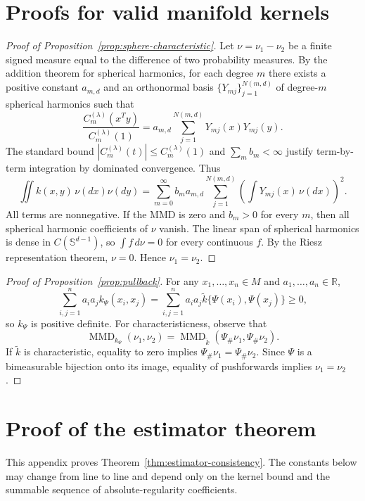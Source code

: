 \documentclass[11pt]{article}
\newcommand{\R}{\mathbb{R}}
\newcommand{\1}{\mathbf{1}}
\newcommand{\MMD}{\operatorname{MMD}}
\newcommand{\Sphere}{\mathbb{S}}
\begin{document}
\section{Proofs for valid manifold kernels}
\label{app:kernels}

\begin{proof}[Proof of Proposition~\ref{prop:sphere-characteristic}]
Let $\nu=\nu_1-\nu_2$ be a finite signed measure equal to the difference of two probability measures. By the addition theorem for spherical harmonics, for each degree $m$ there exists a positive constant $a_{m,d}$ and an orthonormal basis $\{Y_{mj}\}_{j=1}^{N(m,d)}$ of degree-$m$ spherical harmonics such that
\[
\frac{C_m^{(\lambda)}(x^Ty)}{C_m^{(\lambda)}(1)}
=a_{m,d}\sum_{j=1}^{N(m,d)}Y_{mj}(x)Y_{mj}(y).
\]
The standard bound $|C_m^{(\lambda)}(t)|\le C_m^{(\lambda)}(1)$ and $\sum_m b_m<\infty$ justify term-by-term integration by dominated convergence. Thus
\[
\iint k(x,y)\,\nu(dx)\nu(dy)
=\sum_{m=0}^\infty b_m a_{m,d}\sum_{j=1}^{N(m,d)}\left(\int Y_{mj}(x)\,\nu(dx)\right)^2.
\]
All terms are nonnegative. If the MMD is zero and $b_m>0$ for every $m$, then all spherical harmonic coefficients of $\nu$ vanish. The linear span of spherical harmonics is dense in $C(\Sphere^{d-1})$, so $\int f\,d\nu=0$ for every continuous $f$. By the Riesz representation theorem, $\nu=0$. Hence $\nu_1=\nu_2$.
\end{proof}

\begin{proof}[Proof of Proposition~\ref{prop:pullback}]
For any $x_1,\ldots,x_n\in M$ and $a_1,\ldots,a_n\in\R$,
\[
\sum_{i,j=1}^n a_i a_j k_\Psi(x_i,x_j)
=\sum_{i,j=1}^n a_i a_j\widetilde k\{\Psi(x_i),\Psi(x_j)\}\ge0,
\]
so $k_\Psi$ is positive definite. For characteristicness, observe that
\[
\MMD_{k_\Psi}(\nu_1,\nu_2)
=
\MMD_{\widetilde k}(\Psi_\#\nu_1,\Psi_\#\nu_2).
\]
If $\widetilde k$ is characteristic, equality to zero implies $\Psi_\#\nu_1=\Psi_\#\nu_2$. Since $\Psi$ is a bimeasurable bijection onto its image, equality of pushforwards implies $\nu_1=\nu_2$.
\end{proof}

\section{Proof of the estimator theorem}
\label{app:estimator-proof}

This appendix proves Theorem~\ref{thm:estimator-consistency}. The constants below may change from line to line and depend only on the kernel bound and the summable sequence of absolute-regularity coefficients.
\end{document}
